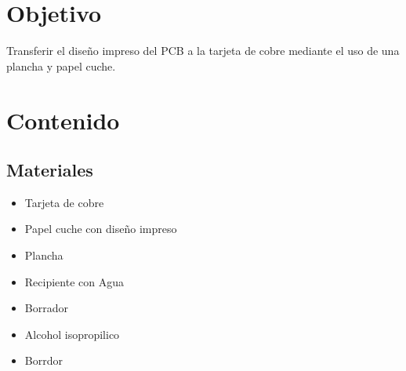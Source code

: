 \documentclass[12pt]{report}
\begin{document}
\chapter*{Objetivo}
Transferir el diseño impreso del PCB a la tarjeta de cobre mediante el uso de una plancha y papel cuche.
\newpage

\chapter{Contenido}
\section{Materiales}
\begin{itemize}
    \item Tarjeta de cobre
    \item Papel cuche con diseño impreso
    \item Plancha
    \item Recipiente con Agua
    \item Borrador
    \item Alcohol isopropilico
    \item Borrdor
\end{itemize}
\end{document}

